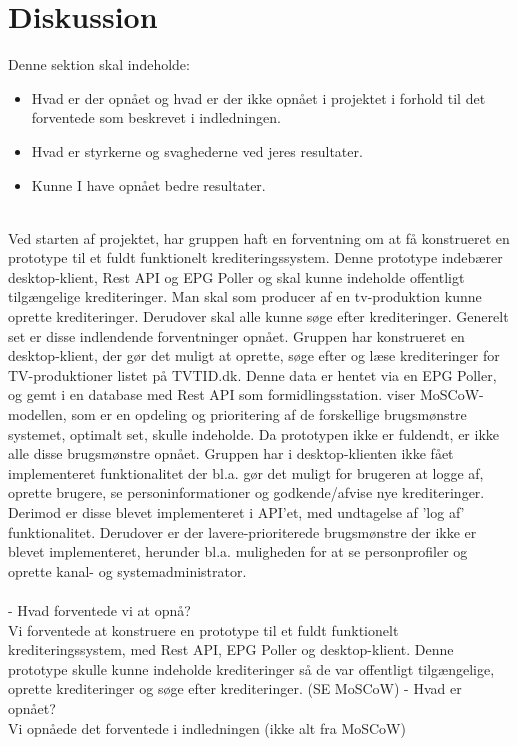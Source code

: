 \section{Diskussion}
Denne sektion skal indeholde:

\begin{itemize}
    \item Hvad er der opnået og hvad er der ikke opnået i projektet i forhold til det forventede som beskrevet i indledningen.
    \item Hvad er styrkerne og svaghederne ved jeres resultater.
    \item Kunne I have opnået bedre resultater.
\end{itemize}{}
\\
Ved starten af projektet, har gruppen haft en forventning om at få konstrueret en prototype til et fuldt funktionelt krediteringssystem. Denne prototype indebærer desktop-klient, Rest API og EPG Poller og skal kunne indeholde offentligt tilgængelige krediteringer. Man skal som producer af en tv-produktion kunne oprette krediteringer. Derudover skal alle kunne søge efter krediteringer. 
Generelt set er disse indlendende forventninger opnået. Gruppen har konstrueret en desktop-klient, der gør det muligt at oprette, søge efter og læse krediteringer for TV-produktioner listet på TVTID.dk. Denne data er hentet via en EPG Poller, og gemt i en database med Rest API som formidlingsstation.
 viser MoSCoW-modellen, som er en opdeling og prioritering af de forskellige brugsmønstre systemet, optimalt set, skulle indeholde. Da prototypen ikke er fuldendt, er ikke alle disse brugsmønstre opnået.
Gruppen har i desktop-klienten ikke fået implementeret funktionalitet der bl.a. gør det muligt for brugeren at logge af, oprette brugere, se personinformationer og godkende/afvise nye krediteringer. Derimod er disse blevet implementeret i API'et, med undtagelse af 'log af' funktionalitet. Derudover er der lavere-prioriterede brugsmønstre der ikke er blevet implementeret, herunder bl.a. muligheden for at se personprofiler og oprette kanal- og systemadministrator. \\



\\
- Hvad forventede vi at opnå? \\ Vi forventede at konstruere en prototype til et fuldt funktionelt krediteringssystem, med Rest API, EPG Poller og desktop-klient. Denne prototype skulle kunne indeholde krediteringer så de var offentligt tilgængelige, oprette krediteringer og søge efter krediteringer. (SE MoSCoW)   - Hvad er opnået? \\ Vi opnåede det forventede i indledningen (ikke alt fra MoSCoW) \\




